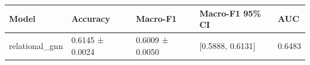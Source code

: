\begin{tabular}{lllll}
\toprule
Model & Accuracy & Macro-F1 & Macro-F1 95\% CI & AUC \\
\midrule
relational\_gnn & 0.6145 ± 0.0024 & 0.6009 ± 0.0050 & [0.5888, 0.6131] & 0.6483 \\
\bottomrule
\end{tabular}
